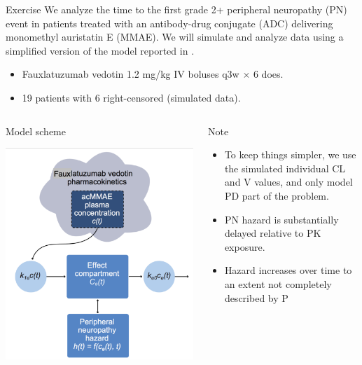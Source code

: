 \documentclass[presentation, allowframebreaks]{beamer}
\begin{document}
\begin{frame}[label={sec:org340d88e}]{Exercise}
We analyze the time to the first grade 2+ peripheral neuropathy
(PN) event in patients treated with an antibody-drug conjugate (ADC) delivering monomethyl auristatin E
(MMAE). We will simulate and analyze data using a simplified version of the
model reported in \cite{lu_time--event_2017}.
\begin{itemize}
\item Fauxlatuzumab vedotin 1.2 mg/kg IV boluses q3w \(\times\) 6 does.
\item 19 patients with 6 right-censored (simulated data).
\end{itemize}
\begin{columns}
\begin{column}{0.3\columnwidth}
\begin{block}{Model scheme}
\begin{center}
\includegraphics[width=0.9\columnwidth]{./figures/lu2017Model.pdf}
\end{center}
\end{block}
\end{column}
\begin{column}{0.7\columnwidth}
\begin{block}{Note}
\begin{itemize}
\item To keep things simpler, we use the simulated individual CL and V values, and only model PD part of the problem.
\item PN hazard is substantially delayed relative to PK exposure.
\item Hazard increases over time to an extent not completely described by P
\end{itemize}
\end{block}
\end{column}
\end{columns}
\end{frame}
\end{document}
